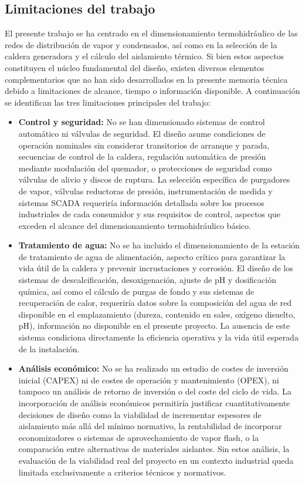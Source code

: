 \documentclass[12pt]{article}
\begin{document}
\subsection{Limitaciones del trabajo}
\label{subsec:limitaciones}

El presente trabajo se ha centrado en el dimensionamiento termohidráulico de las redes de distribución de vapor y condensados, así como en la selección de la caldera generadora y el cálculo del aislamiento térmico. Si bien estos aspectos constituyen el núcleo fundamental del diseño, existen diversos elementos complementarios que no han sido desarrollados en la presente memoria técnica debido a limitaciones de alcance, tiempo o información disponible. A continuación se identifican las tres limitaciones principales del trabajo:

\begin{itemize}[leftmargin=2em]
	\item \textbf{Control y seguridad:} No se han dimensionado sistemas de control automático ni válvulas de seguridad. El diseño asume condiciones de operación nominales sin considerar transitorios de arranque y parada, secuencias de control de la caldera, regulación automática de presión mediante modulación del quemador, o protecciones de seguridad como válvulas de alivio y discos de ruptura. La selección específica de purgadores de vapor, válvulas reductoras de presión, instrumentación de medida y sistemas SCADA requeriría información detallada sobre los procesos industriales de cada consumidor y sus requisitos de control, aspectos que exceden el alcance del dimensionamiento termohidráulico básico.

	\item \textbf{Tratamiento de agua:} No se ha incluido el dimensionamiento de la estación de tratamiento de agua de alimentación, aspecto crítico para garantizar la vida útil de la caldera y prevenir incrustaciones y corrosión. El diseño de los sistemas de descalcificación, desoxigenación, ajuste de pH y dosificación química, así como el cálculo de purgas de fondo y sus sistemas de recuperación de calor, requeriría datos sobre la composición del agua de red disponible en el emplazamiento (dureza, contenido en sales, oxígeno disuelto, pH), información no disponible en el presente proyecto. La ausencia de este sistema condiciona directamente la eficiencia operativa y la vida útil esperada de la instalación.

	\item \textbf{Análisis económico:} No se ha realizado un estudio de costes de inversión inicial (CAPEX) ni de costes de operación y mantenimiento (OPEX), ni tampoco un análisis de retorno de inversión o del coste del ciclo de vida. La incorporación de análisis económicos permitiría justificar cuantitativamente decisiones de diseño como la viabilidad de incrementar espesores de aislamiento más allá del mínimo normativo, la rentabilidad de incorporar economizadores o sistemas de aprovechamiento de vapor flash, o la comparación entre alternativas de materiales aislantes. Sin estos análisis, la evaluación de la viabilidad real del proyecto en un contexto industrial queda limitada exclusivamente a criterios técnicos y normativos.
\end{itemize}
\end{document}
